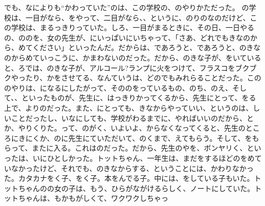 でも、なによりも“かわっていた”のは、この学校の、のやりかただった。 の学校は、一目がなら、をやって、二目がなら、、というに、のりのなのだけど、この学校は、まるっきりっていた。しろ、一目がまるときに、その日、一日やるの、ののを、女の先生が、にいっぱいにいちゃって、「さあ、どれでもきなのから、めてください」といったんだ。だからは、であろうと、であろうと、のきなのからめていっこうに、かまわないのだった。だから、のきな子が、をいていると、ろでは、のきな子が、アルコール?ランプに火をつけて、フラスコをブクブクやったり、かをさせてる、なんていうは、どのでもみれらることだった。こののやりは、になるにしたがって、そののをっているもの、のち、のえ、そして、、といったものが、先生に、はっきりかってくるから、先生にとって、をる上で、よりのだった。また、にとっても、きなからやっていい、というのは、しいことだったし、いなにしても、学校がわるまでに、やればいいのだから、とか、やりくりた。って、のがく、いよいよ、からなくなってくると、先生のところにきにくか、のに先生にていただいて、のくまで、えてもらう。そして、をもらって、またに入る。これはのだった。だから、先生のやを、ボンヤリく、といったは、いにひとしかった。トットちゃん、一年生は、まだをするほどのをめていなかったけど、それでも、のきなからする、ということには、かわりなかった。カタカナをく子、をく子。本をんでる子。中には、をしている子もいた。トットちゃんのの女の子は、もう、ひらがながけるらしく、ノートにしていた。トットちゃんは、もかもがしくて、ワクワクしちゃっ